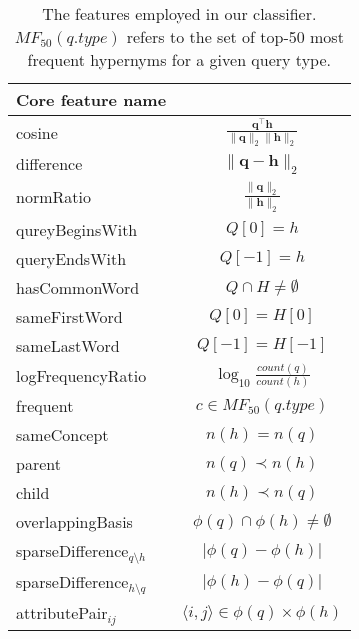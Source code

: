 \documentclass[11pt,a4paper]{article}
\begin{document}
\begin{table}
	\begin{tabular}{lc}
    \toprule
		Core feature name   & \\
    \midrule
		{cosine}            & $\frac{\mathbf{q}^\intercal \mathbf{h}}{\lVert \mathbf{q} \rVert_2\lVert \mathbf{h} \rVert_2}$ \\ %
		{difference}        & $\lVert \mathbf{q} - \mathbf{h} \rVert_2$ \\ %
		{normRatio}         & $\frac{\lVert \mathbf{q}\rVert_2}{\lVert 
		\mathbf{h} \rVert_2}$ \\ %
    \midrule
		{qureyBeginsWith}   & $Q[0] = h$ \\ %
		{queryEndsWith}     & $Q[-1] = h$ \\
		{hasCommonWord} & $Q \cap H \neq \emptyset$ \\ %
		{sameFirstWord}        & $Q[0] = H[0]$ \\ %
		{sameLastWord}        & $Q[-1] = H[-1]$ \\
		{logFrequencyRatio} & $\log_{10}\frac{count(q)}{count(h)}$ \\ %
	    {frequent}\footnote\footnotemark & $c \in MF_{50}(q.type)$\\
    \midrule
    sameConcept & $n(h)=n(q)$ \\
    parent  & $n(q)\prec n(h)$ \\
    child  & $n(h)\prec n(q)$ \\
    \midrule
{overlappingBasis}  & $\phi(q) \cap \phi(h) \neq \emptyset$ \\ %
{sparseDifference$_{q\setminus h}$} & $\lvert \phi(q) - \phi(h) \rvert$ \\ %
{sparseDifference$_{h\setminus q}$} & $\lvert \phi(h) - \phi(q) \rvert$ \\
attributePair$_{ij}$      & $\langle i,j\rangle\in\phi(q)\times\phi(h)$ \\ %
    \bottomrule
	\end{tabular}
  \caption{The features employed in our classifier. $MF_{50}(q.type)$ refers to 
  the set of top-50 most frequent hypernyms for a given query type.}
	\label{table:core_features}
\end{table}


\end{document}
